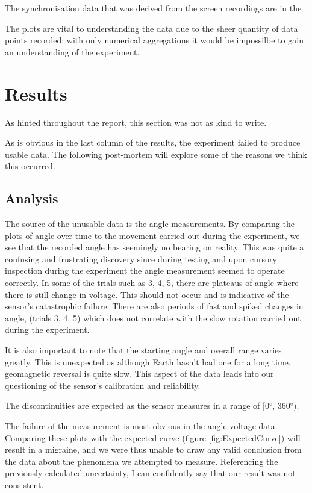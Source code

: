 The synchronisation data that was derived from the screen recordings are in the .

The plots are vital to understanding the data due to the sheer quantity of data points recorded; with only numerical aggregations it would be impossilbe to gain an understanding of the experiment.



\section*{Results}

As hinted throughout the report, this section was not as kind to write. 

As is obvious in the last column of the results, the experiment failed to produce usable data. The following post-mortem will explore some of the reasons we think this occurred.

\subsection*{Analysis}

The source of the unusable data is the angle measurements. By comparing the plots of angle over time to the movement carried out during the experiment, we see that the recorded angle has seemingly no bearing on reality. This was quite a confusing and frustrating discovery since during testing and upon cursory inspection during the experiment the angle measurement seemed to operate correctly. 
In some of the trials such as 3, 4, 5, there are plateaus of angle where there is still change in voltage. This should not occur and is indicative of the sensor's catastrophic failure. There are also periods of fast and spiked changes in angle, (trials 3, 4, 5) which does not correlate with the slow rotation carried out during the experiment.

It is also important to note that the starting angle and overall range varies greatly. This is unexpected as although Earth hasn't had one for a long time, geomagnetic reversal is quite slow. This aspect of the data leads into our questioning of the sensor's calibration and reliability.

The discontinuities are expected as the sensor measures in a range of $[0°, \, 360°)$.

The failure of the measurement is most obvious in the angle-voltage data. Comparing these plots with the expected curve (figure \ref{fig:ExpectedCurve}) will result in a migraine, and we were thus unable to draw any valid conclusion from the data about the phenomena we attempted to measure. Referencing the previously calculated uncertainty, I can confidently say that our result was not consistent.

